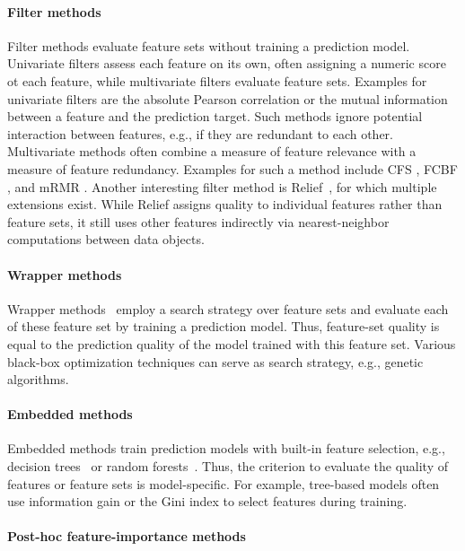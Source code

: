 \documentclass{article}
\theoremstyle{definition}
\begin{document}
\paragraph{Filter methods}

Filter methods evaluate feature sets without training a prediction model.
Univariate filters assess each feature on its own, often assigning a numeric score ot each feature, while multivariate filters evaluate feature sets.
Examples for univariate filters are the absolute Pearson correlation or the mutual information between a feature and the prediction target.
Such methods ignore potential interaction between features, e.g., if they are redundant to each other.
Multivariate methods often combine a measure of feature relevance with a measure of feature redundancy.
Examples for such a method include CFS \cite{hall1999correlation}, FCBF \cite{yu2003feature}, and mRMR \cite{peng2005feature}.
Another interesting filter method is Relief~\cite{kira1992feature}, for which multiple extensions exist.
While Relief assigns quality to individual features rather than feature sets, it still uses other features indirectly via nearest-neighbor computations between data objects.

\paragraph{Wrapper methods}

Wrapper methods~\cite{kohavi1997wrappers} employ a search strategy over feature sets and evaluate each of these feature set by training a prediction model.
Thus, feature-set quality is equal to the prediction quality of the model trained with this feature set.
Various black-box optimization techniques can serve as search strategy, e.g., genetic algorithms.

\paragraph{Embedded methods}

Embedded methods train prediction models with built-in feature selection, e.g., decision trees~\cite{breiman1984classification} or random forests~\cite{breiman2001random}.
Thus, the criterion to evaluate the quality of features or feature sets is model-specific.
For example, tree-based models often use information gain or the Gini index to select features during training.

\paragraph{Post-hoc feature-importance methods}
\end{document}
